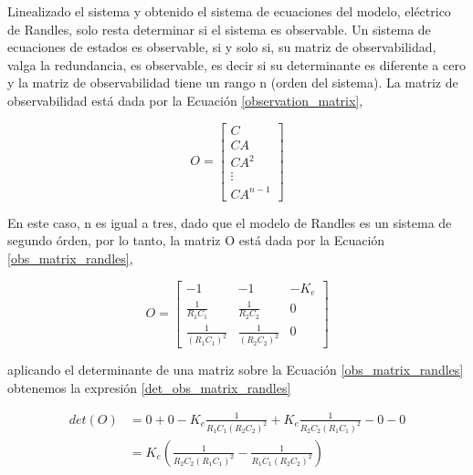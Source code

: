 \documentclass[10pt, a4paper]{article}
\newcounter{subsubsubsection}[subsubsection]
\begin{document}
\newpage


Linealizado el sistema y obtenido el sistema de ecuaciones del modelo,
el\'ectrico de Randles, solo resta determinar si el sistema es observable. Un
sistema de ecuaciones de estados es observable, si y solo si, su matriz de
observabilidad, valga la redundancia, es observable, es decir si su determinante 
es diferente a cero y la matriz de observabilidad tiene un rango n 
(orden del sistema). La matriz de observabilidad est\'a dada por la Ecuaci\'on 
\ref{observation_matrix},

\begin{equation}
    O = \begin{bmatrix}
        C\\
        CA\\
        CA^2\\
        \vdots\\
        CA^{n-1}
        \end{bmatrix}\label{observation_matrix}
\end{equation}

En este caso, n es igual a tres, dado que el modelo de Randles es un sistema de 
segundo \'orden, por lo tanto, la matriz O est\'a dada por la Ecuaci\'on 
\ref{obs_matrix_randles},

\begin{equation}
    O = \begin{bmatrix}
        -1 & -1 & -K_e \\
        \frac{1}{R_1C_1} & \frac{1}{R_2C_2} & 0 \\
        \frac{1}{\left(R_1C_1\right)^2} & \frac{1}{\left(R_2C_2\right)^2} & 0
        \end{bmatrix}\label{obs_matrix_randles}
\end{equation}

aplicando el determinante de una matriz sobre la Ecuaci\'on
\ref{obs_matrix_randles} obtenemos la expresi\'on \ref{det_obs_matrix_randles}

\begin{align}
    det\left(O\right) &= 0 + 0 -K_e \frac{1}{R_1C_1\left(R_2C_2\right)^2} + 
                        K_e \frac{1}{R_2C_2\left(R_1C_1\right)^2} - 0 -
                        0\nonumber\\
                      &= K_e \left(\frac{1}{R_2C_2\left(R_1C_1\right)^2} - 
                                   \frac{1}{R_1C_1\left(R_2C_2\right)^2}\right)
                                   \label{det_obs_matrix_randles}
\end{align}
\end{document}
